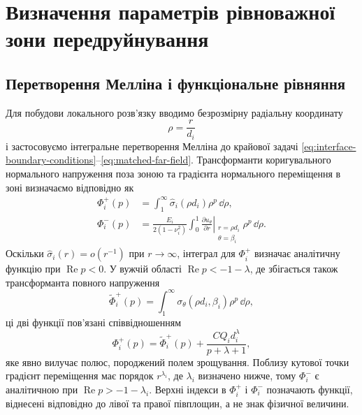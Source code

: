 \section{Визначення параметрів рівноважної зони передруйнування}
\label{sec:derivation}

\subsection{Перетворення Мелліна і функціональне рівняння}
\label{subsec:mellin}

Для побудови локального розв'язку вводимо безрозмірну радіальну
координату
\begin{equation*}
  \rho=\frac{r}{d_i}
\end{equation*}
і застосовуємо інтегральне перетворення Мелліна до крайової задачі
\eqref{eq:interface-boundary-conditions}--\eqref{eq:matched-far-field}.
Трансформанти коригувального нормального напруження поза зоною та
градієнта нормального переміщення в зоні визначаємо відповідно як
\begin{equation*}
\begin{aligned}
  \Phi_i^+(p)
    &=\int_1^\infty
      \widehat{\sigma}_i(\rho d_i)\rho^p\,\dd\rho,\\
  \Phi_i^-(p)
    &=\frac{E_i}{2(1-\nu_i^2)}
      \int_0^1
      \left.
      \frac{\partial u_\theta}{\partial r}
      \right|_{\substack{r=\rho d_i\\\theta=\beta_i}}
      \rho^p\,\dd\rho.
\end{aligned}
\end{equation*}
Оскільки $\widehat{\sigma}_i(r)=o(r^{-1})$ при $r\to\infty$,
інтеграл для $\Phi_i^+$ визначає аналітичну функцію при
$\operatorname{Re}p<0$. У вужчій області
$\operatorname{Re}p<-1-\lambda$, де збігається також трансформанта
повного напруження
\begin{equation*}
  \widetilde{\Phi}_i^+(p)
  =\int_1^\infty
    \sigma_\theta(\rho d_i,\beta_i)\rho^p\,\dd\rho,
\end{equation*}
ці дві функції пов'язані співвідношенням
\begin{equation*}
  \Phi_i^+(p)
  =\widetilde{\Phi}_i^+(p)
   +\frac{CQ_i d_i^\lambda}{p+\lambda+1},
\end{equation*}
яке явно вилучає полюс, породжений полем зрощування. Поблизу кутової точки градієнт переміщення
має порядок $r^{\lambda_i}$, де $\lambda_i$ визначено нижче, тому
$\Phi_i^-$ є аналітичною при
$\operatorname{Re}p>-1-\lambda_i$. Верхні індекси в $\Phi_i^+$ і
$\Phi_i^-$ позначають функції, віднесені відповідно до лівої та правої
півплощин, а не знак фізичної величини.

